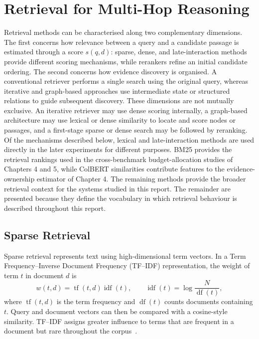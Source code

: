 \section{Retrieval for Multi-Hop Reasoning}
\label{sec:retrieval}

Retrieval methods can be characterised along two complementary dimensions. The
first concerns how relevance between a query and a candidate passage is
estimated through a score \(s(q,d)\): sparse, dense, and late-interaction
methods provide different scoring mechanisms, while rerankers refine an initial
candidate ordering. The second concerns how evidence discovery is organised.
A conventional retriever performs a single search using the original query,
whereas iterative and graph-based approaches use intermediate state or
structured relations to guide subsequent discovery. These dimensions are not
mutually exclusive. An iterative retriever may use dense scoring internally, a
graph-based architecture may use lexical or dense similarity to locate and
score nodes or passages, and a first-stage sparse or dense search may be
followed by reranking. Of the mechanisms described below, lexical and late-interaction methods are used directly in the later experiments for different purposes. BM25 provides the retrieval rankings used in the cross-benchmark budget-allocation studies of Chapters 4 and 5, while ColBERT similarities contribute features to the evidence-ownership estimator of Chapter 4. The remaining methods provide the broader retrieval context for the systems studied in this report. The remainder are
presented because they define the vocabulary in which retrieval behaviour is
described throughout this report.

\subsection{Sparse Retrieval}
\label{subsec:sparse-retrieval}

Sparse retrieval represents text using high-dimensional term vectors. In a
Term Frequency--Inverse Document Frequency (TF--IDF) representation, the weight
of term \(t\) in document \(d\) is
\begin{equation}
  w(t,d)=\operatorname{tf}(t,d)\operatorname{idf}(t),
  \qquad
  \operatorname{idf}(t)=\log\frac{N}{\operatorname{df}(t)},
  \label{eq:tfidf}
\end{equation}
where \(\operatorname{tf}(t,d)\) is the term frequency and
\(\operatorname{df}(t)\) counts documents containing \(t\). Query and document
vectors can then be compared with a cosine-style similarity. TF--IDF assigns
greater influence to terms that are frequent in a document but rare throughout
the corpus~\cite{salton1988term}.

